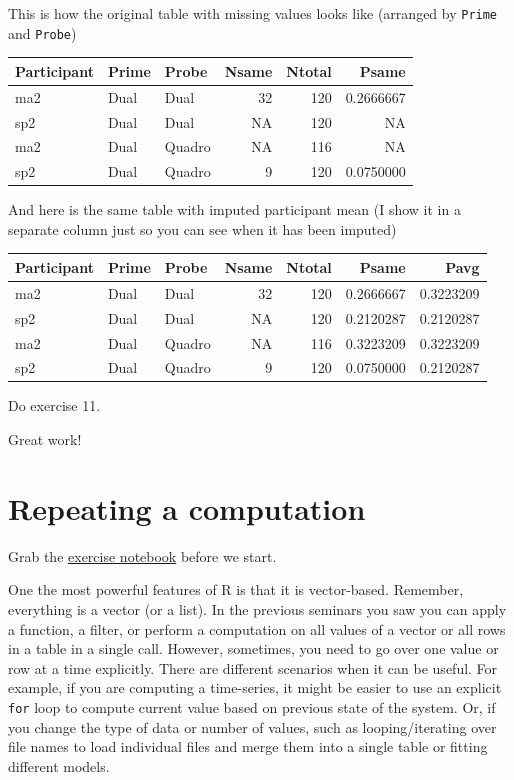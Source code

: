 \documentclass[
]{book}
\begin{document}
This is how the original table with missing values looks like (arranged by \texttt{Prime} and \texttt{Probe})

\begin{tabular}{l|l|l|r|r|r}
\hline
Participant & Prime & Probe & Nsame & Ntotal & Psame\\
\hline
ma2 & Dual & Dual & 32 & 120 & 0.2666667\\
\hline
sp2 & Dual & Dual & NA & 120 & NA\\
\hline
ma2 & Dual & Quadro & NA & 116 & NA\\
\hline
sp2 & Dual & Quadro & 9 & 120 & 0.0750000\\
\hline
\end{tabular}

And here is the same table with imputed participant mean (I show it in a separate column just so you can see when it has been imputed)

\begin{tabular}{l|l|l|r|r|r|r}
\hline
Participant & Prime & Probe & Nsame & Ntotal & Psame & Pavg\\
\hline
ma2 & Dual & Dual & 32 & 120 & 0.2666667 & 0.3223209\\
\hline
sp2 & Dual & Dual & NA & 120 & 0.2120287 & 0.2120287\\
\hline
ma2 & Dual & Quadro & NA & 116 & 0.3223209 & 0.3223209\\
\hline
sp2 & Dual & Quadro & 9 & 120 & 0.0750000 & 0.2120287\\
\hline
\end{tabular}

Do exercise 11.

Great work!

\hypertarget{seminar10}{%
\chapter{Repeating a computation}\label{seminar10}}

Grab the \href{notebooks/Seminar\%2010\%20-\%20repetition.Rmd}{exercise notebook} before we start.

One the most powerful features of R is that it is vector-based. Remember, everything is a vector (or a list). In the previous seminars you saw you can apply a function, a filter, or perform a computation on all values of a vector or all rows in a table in a single call. However, sometimes, you need to go over one value or row at a time explicitly. There are different scenarios when it can be useful. For example, if you are computing a time-series, it might be easier to use an explicit \texttt{for} loop to compute current value based on previous state of the system. Or, if you change the type of data or number of values, such as looping/iterating over file names to load individual files and merge them into a single table or fitting different models.
\end{document}
